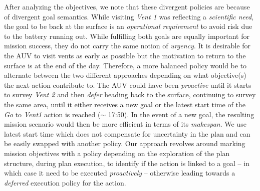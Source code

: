 After analyzing the objectives, we note that these divergent policies
are because of divergent goal semantics. While visiting {\em Vent 1}
was reflecting a \emph{scientific need}, the goal to be back at the
surface is an \emph{operational requirement} to avoid risk due to the
battery running out. While fulfilling both goals are equally important
for mission success, they do not carry the same notion of {\em
  urgency}. It is desirable for the AUV to visit vents as early as
possible but the motivation to return to the surface is at the end of
the day. Therefore, a more balanced policy would be to alternate
between the two different approaches depending on what objective(s)
the next action contribute to. The AUV could have been {\em proactive}
until it starts to survey {\em Vent 2} and then {\em defer} heading
back to the surface, continuing to survey the same area, until it
either receives a new goal or the latest start time of the {\em Go} to
\emph{Vent1} action is reached ($\sim$ 17:50). In the event of a new
goal,
the resulting mission scenario would then be more efficient in terms
of its \emph{makespan}. We use latest start time which does not
compensate for uncertainty in the plan and can be easily swapped with
another policy.  Our approach revolves around marking mission
objectives with a policy depending on the exploration of the plan
structure, during plan execution, to identify if the action is linked
to a goal -- in which case it need to be executed {\em proactively} --
otherwise leading towards a {\em deferred} execution policy for the
action.
 


